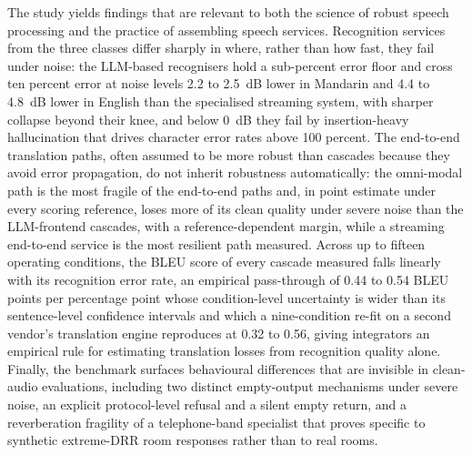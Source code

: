 The study yields findings that are relevant to both the science of robust
speech processing and the practice of assembling speech services. Recognition
services from the three classes differ sharply in where, rather than how
fast, they fail under noise: the LLM-based recognisers hold a sub-percent
error floor and cross ten percent error at noise levels 2.2 to 2.5~dB lower
in Mandarin and 4.4 to 4.8~dB lower in English than the specialised
streaming system, with sharper collapse beyond their
knee, and below 0~dB they fail by insertion-heavy hallucination that drives
character error rates above 100 percent. The end-to-end translation paths,
often assumed to be more robust
than cascades because they avoid error propagation, do not inherit
robustness automatically: the omni-modal path is the most fragile of the
end-to-end paths and, in point estimate under every scoring reference,
loses more of its clean
quality under severe noise than the LLM-frontend cascades, with a
reference-dependent margin, while a streaming
end-to-end service is the most resilient path measured. Across up to fifteen
operating conditions, the BLEU score of every cascade measured
falls linearly with its recognition error rate, an empirical pass-through of
0.44 to 0.54 BLEU points per percentage point whose condition-level
uncertainty is wider than its sentence-level confidence intervals and
which a nine-condition re-fit on a second vendor's translation engine
reproduces at 0.32 to 0.56, giving
integrators an empirical rule for estimating
translation losses from recognition
quality alone. Finally, the benchmark surfaces behavioural differences that
are invisible in clean-audio evaluations, including two distinct
empty-output mechanisms under severe noise, an explicit protocol-level
refusal and a silent empty return, and a reverberation fragility of a
telephone-band specialist that proves specific to synthetic extreme-DRR
room responses rather than to real rooms.

